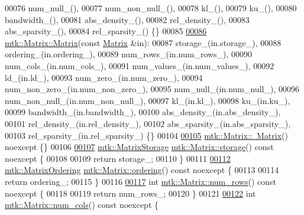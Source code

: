 \begin{DoxyCode}
00076   num\_null\_(),
00077   num\_non\_null\_(),
00078   kl\_(),
00079   ku\_(),
00080   bandwidth\_(),
00081   abs\_density\_(),
00082   rel\_density\_(),
00083   abs\_sparsity\_(),
00084   rel\_sparsity\_() \{\}
00085 
\hypertarget{mtk__matrix_8cc_source_l00086}{}\hyperlink{classmtk_1_1Matrix_ae532878cf9b34114f12a1f06701482aa}{00086} \hyperlink{classmtk_1_1Matrix_a04b8575764d3a649f21950c794f4cc02}{mtk::Matrix::Matrix}(\textcolor{keyword}{const} \hyperlink{classmtk_1_1Matrix}{Matrix} &in):
00087   storage\_(in.storage\_),
00088   ordering\_(in.ordering\_),
00089   num\_rows\_(in.num\_rows\_),
00090   num\_cols\_(in.num\_cols\_),
00091   num\_values\_(in.num\_values\_),
00092   ld\_(in.ld\_),
00093   num\_zero\_(in.num\_zero\_),
00094   num\_non\_zero\_(in.num\_non\_zero\_),
00095   num\_null\_(in.num\_null\_),
00096   num\_non\_null\_(in.num\_non\_null\_),
00097   kl\_(in.kl\_),
00098   ku\_(in.ku\_),
00099   bandwidth\_(in.bandwidth\_),
00100   abs\_density\_(in.abs\_density\_),
00101   rel\_density\_(in.rel\_density\_),
00102   abs\_sparsity\_(in.abs\_sparsity\_),
00103   rel\_sparsity\_(in.rel\_sparsity\_) \{\}
00104 
\hypertarget{mtk__matrix_8cc_source_l00105}{}\hyperlink{classmtk_1_1Matrix_a4e8dd5a0654121513421aaf584ef604e}{00105} \hyperlink{classmtk_1_1Matrix_a4e8dd5a0654121513421aaf584ef604e}{mtk::Matrix::~Matrix}() noexcept \{\}
00106 
\hypertarget{mtk__matrix_8cc_source_l00107}{}\hyperlink{classmtk_1_1Matrix_a9ffaa665a9cf7371b3be568415a08a3b}{00107} \hyperlink{group__c02-enums_ga25b67ec6a2afeee69f9bb196a9c66619}{mtk::MatrixStorage} \hyperlink{classmtk_1_1Matrix_a9ffaa665a9cf7371b3be568415a08a3b}{mtk::Matrix::storage}() const noexcept \{
00108 
00109   \textcolor{keywordflow}{return} storage\_;
00110 \}
00111 
\hypertarget{mtk__matrix_8cc_source_l00112}{}\hyperlink{classmtk_1_1Matrix_a13cd17621652cd5551ff98549bd94df7}{00112} \hyperlink{group__c02-enums_ga622801bd9f912d0f976c3e383f5f581c}{mtk::MatrixOrdering} \hyperlink{classmtk_1_1Matrix_a13cd17621652cd5551ff98549bd94df7}{mtk::Matrix::ordering}() const noexcept \{
00113 
00114   \textcolor{keywordflow}{return} ordering\_;
00115 \}
00116 
\hypertarget{mtk__matrix_8cc_source_l00117}{}\hyperlink{classmtk_1_1Matrix_ab308b25b48e4fcd39fc60e0c3fc66dea}{00117} \textcolor{keywordtype}{int} \hyperlink{classmtk_1_1Matrix_ab308b25b48e4fcd39fc60e0c3fc66dea}{mtk::Matrix::num\_rows}() const noexcept \{
00118 
00119   \textcolor{keywordflow}{return} num\_rows\_;
00120 \}
00121 
\hypertarget{mtk__matrix_8cc_source_l00122}{}\hyperlink{classmtk_1_1Matrix_a2160118d0edf51cf2aaa806ee1b915f8}{00122} \textcolor{keywordtype}{int} \hyperlink{classmtk_1_1Matrix_a2160118d0edf51cf2aaa806ee1b915f8}{mtk::Matrix::num\_cols}() const noexcept \{

\end{DoxyCode}

